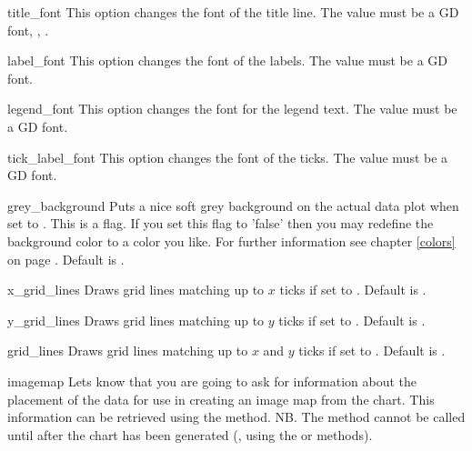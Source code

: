 \begin{AttrDecl}{title\_font}
This option changes the font of the title line. The value must be a GD
font, \eg, .
\end{AttrDecl}

\begin{AttrDecl}{label\_font}
This option changes the font of the labels. The value must be a GD font.
\end{AttrDecl}

\begin{AttrDecl}{legend\_font}
This option changes the font for the legend text. The value must be a
GD font.
\end{AttrDecl}

\begin{AttrDecl}{tick\_label\_font}
This option changes the font of the ticks. The value must be a GD font.
\end{AttrDecl}

\begin{AttrDecl}{grey\_background}
Puts a nice soft grey background on the actual data plot when set to
. This is a flag. If you set this flag to 'false' then you may
redefine the background color to a color you like. For further information see chapter \ref{colors}
on page \pageref{colors}. Default is .
\end{AttrDecl}

\begin{AttrDecl}{x\_grid\_lines}
Draws grid lines matching up to $x$ ticks if set to .
Default is .
\end{AttrDecl}

\begin{AttrDecl}{y\_grid\_lines}
Draws grid lines matching up to $y$ ticks if set to .
Default is .
\end{AttrDecl}

\begin{AttrDecl}{grid\_lines}
Draws grid lines matching up to $x$ and $y$ ticks if set to
. Default is .
\end{AttrDecl}

\begin{AttrDecl}{imagemap}
Lets \chart know that you are going to ask for information about the
placement of the data for use in creating an image map from the chart.
This information can be retrieved using the
\mbox{}
method. NB. The  method cannot be called
until after the chart has been generated (\eg, using the 
or  methods).
\end{AttrDecl}

